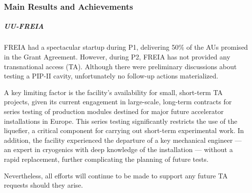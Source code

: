 
\subsubsection*{Main Results and Achievements}


\subparagraph{UU-FREIA}

FREIA had a spectacular startup during P1, delivering 50\% of the AUs promised in the Grant Agreement. However, during P2, FREIA has not provided any transnational access (TA). Although there were preliminary discussions about testing a PIP-II cavity, unfortunately no follow-up actions materialized.

A key limiting factor is the facility’s availability for small, short-term TA projects, given its current engagement in large-scale, long-term contracts for series testing of production modules destined for major future accelerator installations in Europe. This series testing significantly restricts the use of the liquefier, a critical component for carrying out short-term experimental work. In addition, the facility experienced the departure of a key mechanical engineer — an expert in cryogenics with deep knowledge of the installation — without a rapid replacement, further complicating the planning of future tests.

Nevertheless, all efforts will continue to be made to support any future TA requests should they arise.



 



